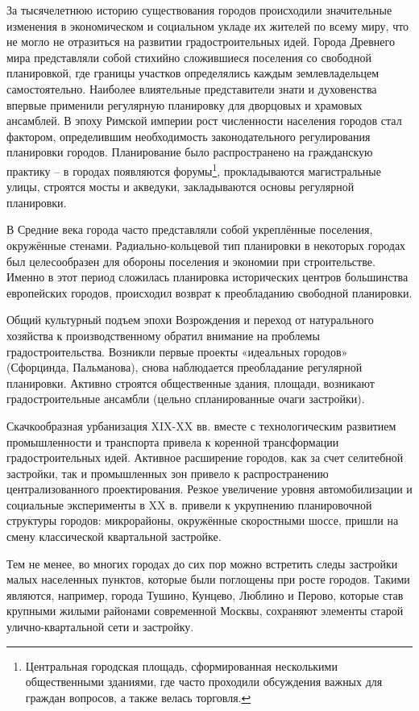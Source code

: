 \documentclass[
  11pt,
  russian,
]{book}
\begin{document}
За тысячелетнюю историю существования городов происходили значительные изменения в экономическом и социальном укладе их жителей по всему миру, что не могло не отразиться на развитии градостроительных идей. Города Древнего мира представляли собой стихийно сложившиеся поселения со
свободной планировкой, где границы участков определялись каждым землевладельцем самостоятельно. Наиболее влиятельные представители знати и духовенства впервые применили регулярную планировку для дворцовых и храмовых ансамблей. В эпоху Римской империи рост численности населения городов стал фактором, определившим необходимость законодательного регулирования планировки городов. Планирование было распространено на гражданскую практику -- в городах появляются форумы\footnote{Центральная городская площадь, сформированная несколькими общественными зданиями, где часто проходили обсуждения важных для граждан вопросов, а также велась торговля.}, прокладываются магистральные улицы, строятся мосты и акведуки, закладываются основы регулярной планировки.

В Средние века города часто представляли собой укреплённые поселения, окружённые стенами. Радиально-кольцевой тип планировки в некоторых городах был целесообразен для обороны поселения и экономии при строительстве. Именно в этот период сложилась планировка исторических центров большинства европейских городов, происходил возврат к преобладанию свободной планировки.

Общий культурный подъем эпохи Возрождения и переход от натурального хозяйства к производственному обратил внимание на проблемы градостроительства. Возникли первые проекты «идеальных городов» (Сфорцинда, Пальманова), снова наблюдается преобладание регулярной планировки. Активно строятся общественные здания, площади, возникают градостроительные ансамбли (цельно спланированные очаги застройки).

Скачкообразная урбанизация XIX-XX вв. вместе с технологическим развитием
промышленности и транспорта привела к коренной трансформации градостроительных идей. Активное расширение городов, как за счет селитебной застройки, так и промышленных зон привело к распространению централизованного проектирования. Резкое увеличение уровня автомобилизации и социальные эксперименты в XX в. привели к укрупнению планировочной
структуры городов: микрорайоны, окружённые скоростными шоссе, пришли на смену классической квартальной застройке.

Тем не менее, во многих городах до сих пор можно встретить следы застройки малых населенных пунктов, которые были поглощены при росте городов. Такими являются, например, города Тушино, Кунцево, Люблино и Перово, которые став крупными жилыми районами современной Москвы, сохраняют элементы старой улично-квартальной сети и застройку.
\end{document}
